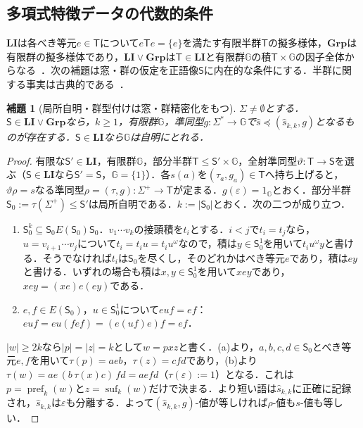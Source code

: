 \documentclass[11pt,a4paper]{ltjsarticle}
\numberwithin{equation}{section}
\theoremstyle{plain}
\newtheorem{lemma}[theorem]{補題}
\theoremstyle{definition}
\theoremstyle{remark}
\newcommand{\eps}{\varepsilon}
\begin{document}
\subsection{多項式特徴データの代数的条件}
\label{subsec:algebraic-typed-data}

$\mathbf{LI}$は各べき等元$e\in \mathsf T$について$e\mathsf Te=\{e\}$を満たす有限半群$\mathsf T$の擬多様体，$\mathbf{Grp}$は有限群の擬多様体であり，$\mathbf{LI}\vee\mathbf{Grp}$は$\mathsf T\in\mathbf{LI}$と有限群${\mathbb G}$の積$\mathsf T\times {\mathbb G}$の因子全体からなる~\cite{Costa2002LI,Costa2002LIG}．次の補題は窓・群の仮定を正語像$\mathsf S$に内在的な条件にする．半群に関する事実は古典的である~\cite{Pin1986}．

\begin{lemma}[局所自明・群型付けは窓・群精密化をもつ]
\label{lem:mcfg-li-group-window}
$\Sigma\ne\emptyset$とする．$\mathsf S\in\mathbf{LI}\vee\mathbf{Grp}$なら，$k\ge1$，有限群${\mathbb G}$，準同型$g:\Sigma^*\to {\mathbb G}$で$\widehat s\preceq(\widehat s_{k,k},g)$となるものが存在する．$\mathsf S\in\mathbf{LI}$なら${\mathbb G}$は自明にとれる．
\end{lemma}

\begin{proof}
有限な$\mathsf S'\in\mathbf{LI}$，有限群${\mathbb G}$，部分半群$\mathsf T\le \mathsf S'\times {\mathbb G}$，全射準同型$\vartheta:\mathsf T\to\mathsf S$を選ぶ（$\mathsf S\in\mathbf{LI}$なら$\mathsf S'=\mathsf S$，${\mathbb G}=\{1\}$）．各$s(a)$を$(\tau_a,g_a)\in \mathsf T$へ持ち上げると，$\vartheta\rho=s$なる準同型$\rho=(\tau,g):\Sigma^+\to \mathsf T$が定まる．$g(\eps)=1_{\mathbb G}$とおく．部分半群$\mathsf S_0:=\tau(\Sigma^+)\le \mathsf S'$は局所自明である．$k:=|\mathsf S_0|$とおく．次の二つが成り立つ．
\begin{enumerate}[label=\textup{(\alph*)},leftmargin=*]
\item $\mathsf S_0^k\subseteq \mathsf S_0E(\mathsf S_0)\mathsf S_0$．$v_1\cdots v_k$の接頭積を$t_i$とする．$i<j$で$t_i=t_j$なら，$u=v_{i+1}\cdots v_j$について$t_i=t_iu=t_iu^\omega$なので，積は$y\in \mathsf S_0^1$を用いて$t_iu^\omega y$と書ける．そうでなければ$t_i$は$\mathsf S_0$を尽くし，そのどれかはべき等元$e$であり，積は$ey$と書ける．いずれの場合も積は$x,y\in \mathsf S_0^1$を用いて$xey$であり，$xey=(xe)e(ey)$である．
\item $e,f\in E(\mathsf S_0)$，$u\in \mathsf S_0^1$について$euf=ef$：$euf=eu(fef)=(e(uf)e)f=ef$．
\end{enumerate}
$|w|\ge2k$なら$|p|=|z|=k$として$w=pxz$と書く．(a)より，$a,b,c,d\in \mathsf S_0$とべき等元$e,f$を用いて$\tau(p)=aeb$，$\tau(z)=cfd$であり，(b)より$\tau(w)=ae\,(b\,\tau(x)c)\,fd=aefd$（$\tau(\eps):=1$）となる．これは$p=\operatorname{pref}_k(w)$と$z=\operatorname{suf}_k(w)$だけで決まる．より短い語は$\widehat s_{k,k}$に正確に記録され，$\widehat s_{k,k}$は$\eps$も分離する．よって$(\widehat s_{k,k},g)$-値が等しければ$\rho$-値も$s$-値も等しい．
\end{proof}
\end{document}
